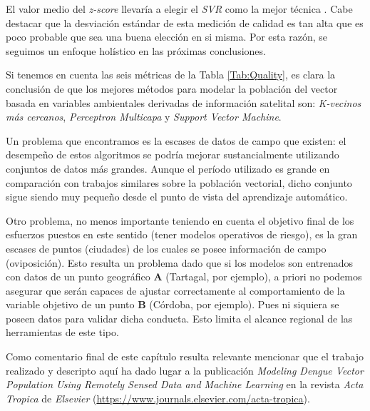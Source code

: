   \par El valor medio del \textit{z-score} llevaría a elegir el \textit{SVR}
    como la mejor técnica \cite{ml_rainfall}. Cabe destacar que la desviación
    estándar de esta medición de calidad es tan alta que es poco probable que
    sea una buena elección en si misma. Por esta razón, se seguimos un
    enfoque holístico en las próximas conclusiones.


  \par Si tenemos en cuenta las seis métricas de la Tabla \ref{Tab:Quality},
    es clara la conclusión de que los mejores métodos para modelar la población
    del vector basada en variables ambientales derivadas de información satelital
    son: \textit{K-vecinos más cercanos}, \textit{Perceptron
    Multicapa} y \textit{Support Vector Machine}.

  \par Un problema que encontramos es la escases de datos de campo que existen:
    el desempeño de estos algoritmos se podría mejorar sustancialmente utilizando
    conjuntos de datos más grandes.
    Aunque el período utilizado es grande en comparación con trabajos similares
    sobre la población vectorial, dicho conjunto sigue siendo
    muy pequeño desde el punto de vista del aprendizaje automático.

  \par Otro problema, no menos importante teniendo en cuenta el objetivo final
    de los esfuerzos puestos en este sentido (tener modelos operativos de
    riesgo), es la gran escases de puntos (ciudades) de los cuales se posee información
    de campo (oviposición). Esto resulta un problema dado que si los modelos son
    entrenados con datos de un punto geográfico \textbf{A} (Tartagal, por ejemplo), a
    priori no podemos asegurar que serán capaces de ajustar correctamente al
    comportamiento de la variable objetivo de un punto \textbf{B} (Córdoba, por ejemplo).
    Pues ni siquiera se poseen datos para validar dicha conducta.
    Esto limita el alcance regional de las herramientas de este tipo.


  \par Como comentario final de este capítulo resulta relevante mencionar que el trabajo
    realizado y descripto aquí ha dado lugar a la publicación
    \textit{Modeling Dengue Vector Population Using Remotely Sensed Data and
    Machine Learning} \cite{scavuzzo2018modeling} en la revista \textit{Acta Tropica}
    de \textit{Elsevier} (\url{https://www.journals.elsevier.com/acta-tropica}).

%

